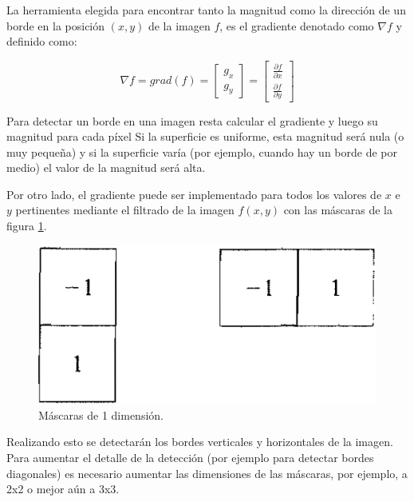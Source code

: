 La herramienta elegida para encontrar tanto la magnitud como la dirección de un borde en la posición $(x,y)$ de la imagen $f$, es el gradiente denotado como ${\nabla}f$ y definido como:

 \begin{equation}
{\nabla}f = grad(f) = \begin{bmatrix}
            {g_x} \\[0.3em]
            {g_y}
            \end{bmatrix} = \begin{bmatrix}
                    {\frac{{\partial}f}{{\partial}x}} \\[0.3em]
                    {\frac{{\partial}f}{{\partial}y}}
                      \end{bmatrix}
 \end{equation}

Para detectar un borde en una imagen resta calcular el gradiente y luego su magnitud para cada píxel Si la superficie es uniforme, esta magnitud será nula (o muy pequeña) y si la superficie varía (por ejemplo, cuando hay un borde de por medio) el valor de la magnitud será alta.

Por otro lado, el gradiente puede ser implementado para todos los valores de $x$ e $y$ pertinentes mediante el filtrado de la imagen $f(x,y)$ con las máscaras de la figura \ref{matrix1d}.

\begin{figure}[H]
\begin{center}
\includegraphics[scale=0.3]{img/matriz1d.png}
\end{center}
\caption{Máscaras de 1 dimensión.}
\label{matrix1d}
\end{figure}

Realizando esto se detectarán los bordes verticales y horizontales de la imagen. Para aumentar el detalle de la detección (por ejemplo para detectar bordes diagonales) es necesario aumentar las dimensiones de las máscaras, por ejemplo, a 2x2 o mejor aún a 3x3.

